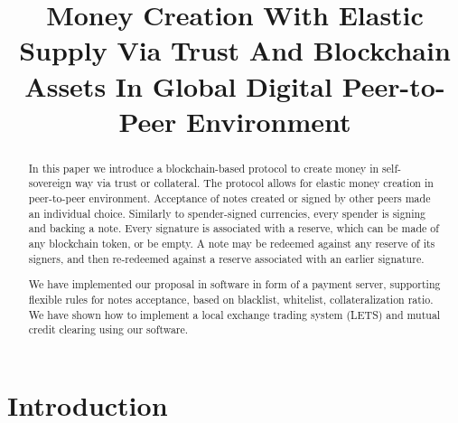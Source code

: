 \documentclass{article}   %
\begin{document}
\title{Money Creation With Elastic Supply Via Trust And Blockchain Assets In
Global Digital Peer-to-Peer Environment}


\maketitle

\begin{abstract}
In this paper we introduce a blockchain-based protocol to create money in self-sovereign way via trust or collateral. The
protocol allows for elastic money creation in peer-to-peer environment. Acceptance of notes created or signed
by other peers made an individual choice. Similarly to spender-signed currencies, every spender is signing and backing a
note. Every signature is associated with a reserve, which can be made of any blockchain token, or be empty. A note may
be redeemed against any reserve of its signers, and then re-redeemed against a reserve associated with an earlier signature.

We have implemented our proposal in software in form of a payment server, supporting flexible rules for notes acceptance,
based on blacklist, whitelist, collateralization ratio. We have shown how to implement a local exchange trading system (LETS)
and mutual credit clearing using our software.
\end{abstract}

\section{Introduction}
\end{document}
